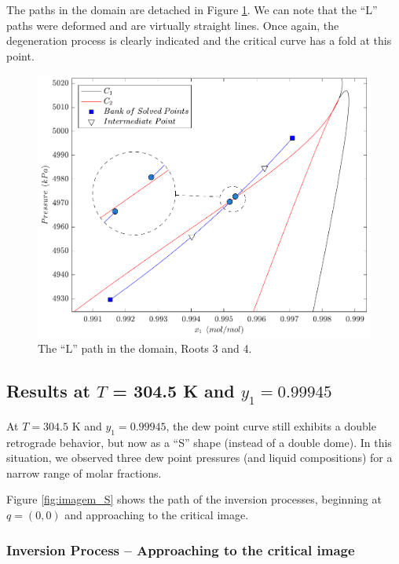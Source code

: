 \documentclass[journal=iecred,manuscript=article]{achemso}
\theoremstyle{definition}
\theoremstyle{remark}
\begin{document}
The paths in the domain are detached in Figure \ref{fig:L_path_domain}. We can note that the \enquote{L} paths were deformed and are virtually straight lines. Once again, the degeneration process is clearly indicated and the critical curve has a fold at this point.

\begin{figure}
	\begin{center}
		\includegraphics[scale=0.50]{caminhos_L_degeneracao_dominio_new.pdf}
		\caption{The \enquote{L} path in the domain, Roots 3 and 4.}\label{fig:L_path_domain}
	\end{center}
\end{figure}

\subsection{Results at $T$ = 304.5 K and $y_1 = 0.99945$}

At $T = 304.5$ K and $y_1 = 0.99945$, the dew point curve still exhibits a double retrograde behavior, but now as a \enquote{S} shape (instead of a double dome). In this situation, we observed three dew point pressures (and liquid compositions) for a narrow range of molar fractions.

Figure \ref{fig:imagem_S} shows the path of the inversion processes, beginning at $q = (0,0)$ and approaching to the critical image.

\subsubsection{Inversion Process -- Approaching to the critical image}
\end{document}
